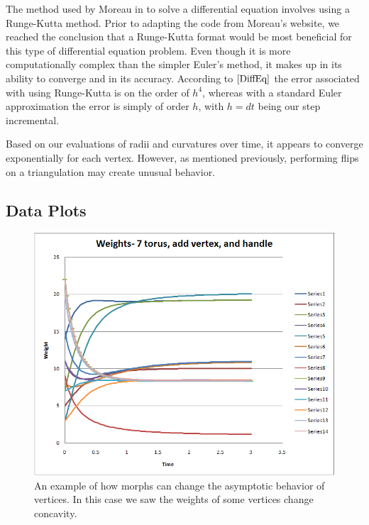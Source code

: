 \documentclass[12pt]{article}
\begin{document}
The method used by Moreau in \cite{JPM} to solve a differential equation involves using a Runge-Kutta method. Prior to adapting the code from Moreau's website, we reached the conclusion that a Runge-Kutta format would be most beneficial for this type of differential equation problem. Even though it is more computationally complex than the simpler Euler's method, it makes up in its ability to converge and in its accuracy. According to $\cite{DiffEq}$ the error associated with using Runge-Kutta is on the order of $h^4$, whereas with a standard Euler approximation the error is simply of order $h$, with $h = dt$ being our step incremental.\newline

\noindent Based on our evaluations of radii and curvatures over time, it appears to converge exponentially for each vertex. However, as mentioned previously, performing flips on a triangulation may create unusual behavior.

\subsection{Data Plots}

\begin{figure}[h]
\begin{center}
\includegraphics[scale = 0.65]{torus7addvaddhweights2.png}
\caption{An example of how morphs can change the asymptotic behavior of vertices. In this case we saw the weights of some vertices change concavity.}
\label{fig:t7vh}
\end{center}
\end{figure}
\end{document}
